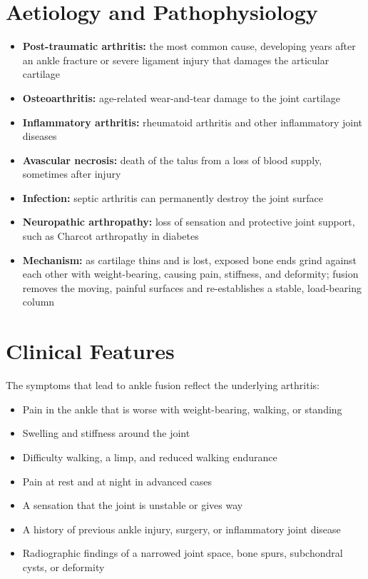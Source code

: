 \section*{Aetiology and Pathophysiology}
\begin{itemize}
    \item \textbf{Post-traumatic arthritis:} the most common cause, developing years after an ankle fracture or severe ligament injury that damages the articular cartilage
    \item \textbf{Osteoarthritis:} age-related wear-and-tear damage to the joint cartilage
    \item \textbf{Inflammatory arthritis:} rheumatoid arthritis and other inflammatory joint diseases
    \item \textbf{Avascular necrosis:} death of the talus from a loss of blood supply, sometimes after injury
    \item \textbf{Infection:} septic arthritis can permanently destroy the joint surface
    \item \textbf{Neuropathic arthropathy:} loss of sensation and protective joint support, such as Charcot arthropathy in diabetes
    \item \textbf{Mechanism:} as cartilage thins and is lost, exposed bone ends grind against each other with weight-bearing, causing pain, stiffness, and deformity; fusion removes the moving, painful surfaces and re-establishes a stable, load-bearing column
\end{itemize}

\section*{Clinical Features}
The symptoms that lead to ankle fusion reflect the underlying arthritis:

\begin{itemize}
    \item Pain in the ankle that is worse with weight-bearing, walking, or standing
    \item Swelling and stiffness around the joint
    \item Difficulty walking, a limp, and reduced walking endurance
    \item Pain at rest and at night in advanced cases
    \item A sensation that the joint is unstable or gives way
    \item A history of previous ankle injury, surgery, or inflammatory joint disease
    \item Radiographic findings of a narrowed joint space, bone spurs, subchondral cysts, or deformity
\end{itemize}

